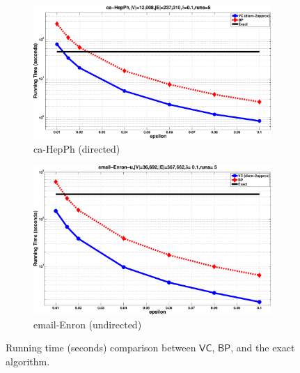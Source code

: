 \begin{figure}[ht]
  \begin{subfigure}[b]{0.46\textwidth}
    \includegraphics[width=0.99\textwidth,keepaspectratio]{figures/eps/ca-HepPh-time}
    \caption{ca-HepPh (directed)}
    \label{fig:HepPh:time}
  \end{subfigure}
  \fi
  \hfill
  \begin{subfigure}[b]{0.46\textwidth}
    \includegraphics[width=0.99\textwidth,keepaspectratio]{figures/eps/email-Enron-time}
    \caption{email-Enron (undirected)}
    \label{fig:email:time}
  \end{subfigure}
  \caption{Running time (seconds) comparison between $\mathsf{VC}$, $\mathsf{BP}$, and the
  exact algorithm.}
  \label{fig:time}
\end{figure}

